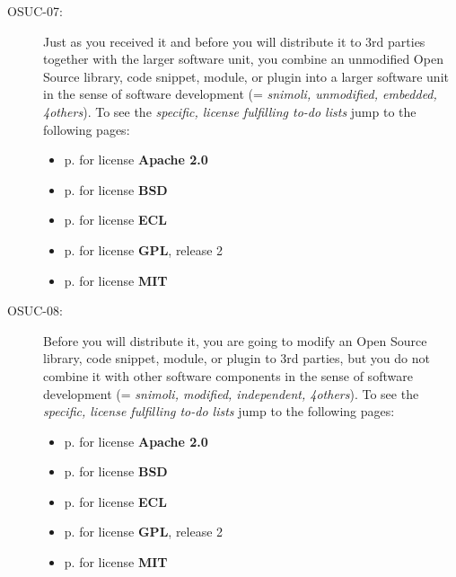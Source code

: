\begin{description}
\item[OSUC-07:]\label{OSUC-07-DEF} Just as you received it and before you will
distribute it to 3rd parties together with the larger software unit, you
combine an unmodified Open Source library, code snippet, module, or plugin into
a larger software unit in the sense of software development (= \textit{snimoli,
unmodified, embedded, 4others}). 
To see the \textit{specific, license fulfilling to-do lists} jump to the
following pages:
  \begin{itemize}
    \item p. \pageref{OSUC-07-Apache20} for license \textbf{Apache 2.0}
    \item p. \pageref{OSUC-07-BSD} for license \textbf{BSD}
    \item p. \pageref{OSUC-07-ECL} for license \textbf{ECL}
    \item p. \pageref{OSUC-07-GPL2X} for license \textbf{GPL}, release 2
    \item p. \pageref{OSUC-07-MIT} for license \textbf{MIT}
  \end{itemize}

\item[OSUC-08:]\label{OSUC-08-DEF} Before you will distribute it, you are going
to modify an Open Source library, code snippet, module, or plugin to 3rd
parties, but you do not combine it with other software components in the sense of
software development (= \textit{snimoli, modified, independent, 4others}). 
To see the \textit{specific, license fulfilling to-do lists} jump to the
following pages:
  \begin{itemize}
    \item p. \pageref{OSUC-08-Apache20} for license \textbf{Apache 2.0}
    \item p. \pageref{OSUC-08-BSD} for license \textbf{BSD}
    \item p. \pageref{OSUC-08-ECL} for license \textbf{ECL}
    \item p. \pageref{OSUC-08-GPL2X} for license \textbf{GPL}, release 2
    \item p. \pageref{OSUC-08-MIT} for license \textbf{MIT}
  \end{itemize}


\end{description}
